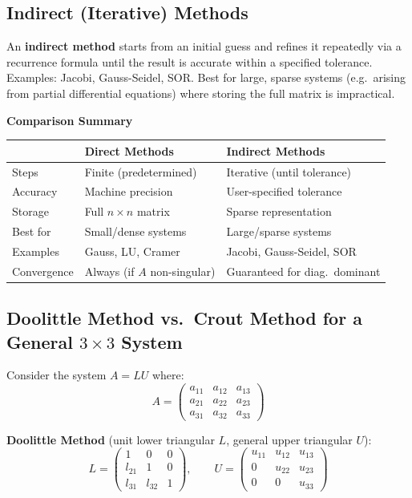 \documentclass[12pt]{article}
\begin{document}
\subsection*{Indirect (Iterative) Methods}

\begin{conceptbox}
An \textbf{indirect method} starts from an initial guess and refines it repeatedly via a recurrence formula until the result is accurate within a specified tolerance. Examples: Jacobi, Gauss-Seidel, SOR. Best for large, sparse systems (e.g.\ arising from partial differential equations) where storing the full matrix is impractical.
\end{conceptbox}

\begin{formulabox}
\textbf{Comparison Summary}\\[4pt]
\begin{tabular}{p{3.5cm} p{4.5cm} p{4.5cm}}
\hline
& \textbf{Direct Methods} & \textbf{Indirect Methods} \\
\hline
Steps & Finite (predetermined) & Iterative (until tolerance) \\
Accuracy & Machine precision & User-specified tolerance \\
Storage & Full $n \times n$ matrix & Sparse representation \\
Best for & Small/dense systems & Large/sparse systems \\
Examples & Gauss, LU, Cramer & Jacobi, Gauss-Seidel, SOR \\
Convergence & Always (if $A$ non-singular) & Guaranteed for diag.\ dominant \\
\hline
\end{tabular}
\end{formulabox}

\vspace{10pt}
\subsection*{Doolittle Method vs.\ Crout Method for a General $3\times3$ System}

Consider the system $A = LU$ where:
\[
  A = \begin{pmatrix} a_{11} & a_{12} & a_{13} \\ a_{21} & a_{22} & a_{23} \\ a_{31} & a_{32} & a_{33} \end{pmatrix}
\]

\vspace{8pt}
\noindent\textbf{Doolittle Method} (unit lower triangular $L$, general upper triangular $U$):
\[
  L = \begin{pmatrix} 1 & 0 & 0 \\ l_{21} & 1 & 0 \\ l_{31} & l_{32} & 1 \end{pmatrix}, \qquad
  U = \begin{pmatrix} u_{11} & u_{12} & u_{13} \\ 0 & u_{22} & u_{23} \\ 0 & 0 & u_{33} \end{pmatrix}
\]
\end{document}
